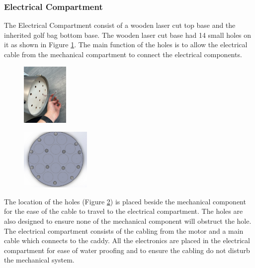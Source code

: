 \documentclass[11pt,landscape]{article}
\begin{document}
\begin{multicols}{3}
    \subsubsection{Electrical Compartment}
    The Electrical Compartment consist of a wooden laser cut top base and the
    inherited golf bag bottom base. The wooden laser cut base had 14 small holes
    on it as shown in Figure \ref{fig:ELECBASE}. The main function of the holes
    is to allow the electrical cable from the mechanical compartment to connect
    the electrical components.
    
    \begin{figure}[H]
        \begin{center}
            \includegraphics[width=0.2\textwidth]{Figure8.jpg}
            \label{fig:ELECBASE}
        \end{center}
    \end{figure}
    
    
    
    \begin{figure}[H]
        \begin{center}
            \includegraphics[width=0.3\textwidth]{Figure9.jpg}
            \label{fig:ELEC}
        \end{center}
    \end{figure}

    The location of the holes (Figure \ref{fig:ELEC}) is placed beside the
    mechanical component for the ease of the cable to travel to the electrical
    compartment. The holes are also designed to ensure none of the mechanical
    component will obstruct the hole. The electrical compartment consists of the
    cabling from the motor and a main cable which connects to the caddy. All the
    electronics are placed in the electrical compartment for ease of water
    proofing and to ensure the cabling do not disturb the mechanical system. 
    

\end{multicols}
\end{document}
